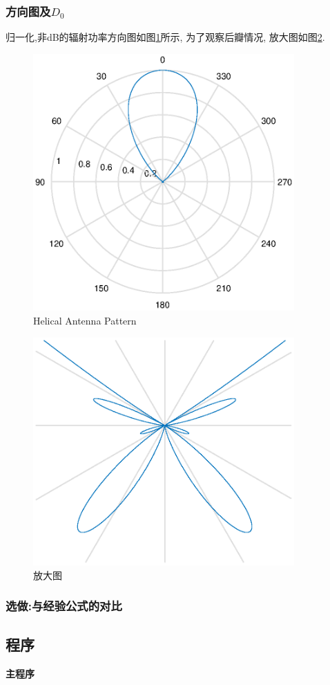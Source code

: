 \subsubsection{方向图及$D_0$}
归一化,非dB的辐射功率方向图如图\ref{fig:HelixP}所示, 为了观察后瓣情况, 放大图如图\ref{fig:HelixP_fangda}. 
\begin{figure}[!ht]
	\centering
	\includegraphics[width=10cm]{HelixPattern.eps}
	\caption{Helical Antenna Pattern} \label{fig:HelixP}
\end{figure}

\begin{figure}[!ht]
	\centering
	\includegraphics[width=10cm]{HelixPattern_fangda.eps}
	\caption{放大图} \label{fig:HelixP_fangda}
\end{figure}

\subsubsection{选做:与经验公式的对比}

\subsection{程序}
\noindent \textbf{主程序}
\begin{lstlisting}[language={matlab},keywordstyle=\color{blue!70},commentstyle=\color{red!50!green!50!blue!50},frame=shadowbox, rulesepcolor=\color{red!20!green!20!blue!20}] 


\end{lstlisting}